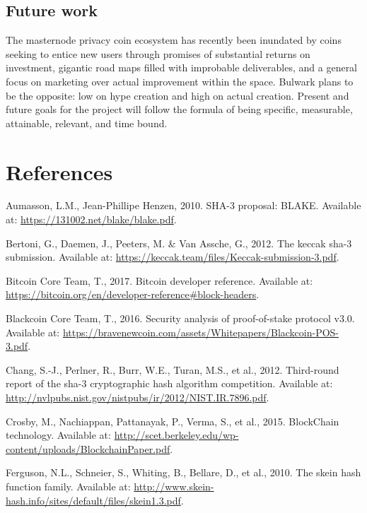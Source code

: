 \documentclass[11pt,a4paperpaper,]{report}
\begin{document}
\section{Future work}\label{future-work}

The masternode privacy coin ecosystem has recently been inundated by
coins seeking to entice new users through promises of substantial
returns on investment, gigantic road maps filled with improbable
deliverables, and a general focus on marketing over actual improvement
within the space. Bulwark plans to be the opposite: low on hype creation
and high on actual creation. Present and future goals for the project
will follow the formula of being specific, measurable, attainable,
relevant, and time bound.

\footnotesize

\chapter*{References}\label{references}

\hypertarget{refs}{}
\hypertarget{ref-Blake}{}
Aumasson, L.M., Jean-Phillipe Henzen, 2010. SHA-3 proposal: BLAKE.
Available at: \url{https://131002.net/blake/blake.pdf}.

\hypertarget{ref-Keccak}{}
Bertoni, G., Daemen, J., Peeters, M. \& Van Assche, G., 2012. The keccak
sha-3 submission. Available at:
\url{https://keccak.team/files/Keccak-submission-3.pdf}.

\hypertarget{ref-Bitcoindev}{}
Bitcoin Core Team, T., 2017. Bitcoin developer reference. Available at:
\url{https://bitcoin.org/en/developer-reference\#block-headers}.

\hypertarget{ref-Blackcoin}{}
Blackcoin Core Team, T., 2016. Security analysis of proof-of-stake
protocol v3.0. Available at:
\url{https://bravenewcoin.com/assets/Whitepapers/Blackcoin-POS-3.pdf}.

\hypertarget{ref-NIST}{}
Chang, S.-J., Perlner, R., Burr, W.E., Turan, M.S., et al., 2012.
Third-round report of the sha-3 cryptographic hash algorithm
competition. Available at:
\url{http://nvlpubs.nist.gov/nistpubs/ir/2012/NIST.IR.7896.pdf}.

\hypertarget{ref-Crosby}{}
Crosby, M., Nachiappan, Pattanayak, P., Verma, S., et al., 2015.
BlockChain technology. Available at:
\url{http://scet.berkeley.edu/wp-content/uploads/BlockchainPaper.pdf}.

\hypertarget{ref-Skein}{}
Ferguson, N.L., Schneier, S., Whiting, B., Bellare, D., et al., 2010.
The skein hash function family. Available at:
\url{http://www.skein-hash.info/sites/default/files/skein1.3.pdf}.
\end{document}

